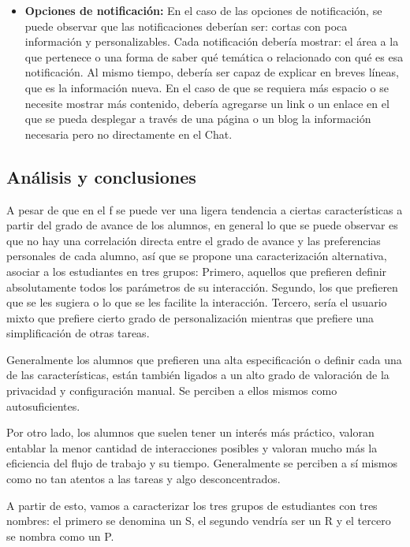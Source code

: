 \begin{itemize}
        \item \textbf{Opciones de notificación:} En el caso de las opciones de notificación, se puede observar que las notificaciones deberían ser: cortas con poca información y personalizables. Cada notificación debería mostrar: el área a la que pertenece o una forma de saber qué temática o relacionado con qué es esa notificación. Al mismo tiempo, debería ser capaz de explicar en breves líneas, que es la información nueva. En el caso de que se requiera más espacio o se necesite mostrar más contenido, debería agregarse un link o un enlace en el que se pueda desplegar a través de una página o un blog la información necesaria pero no directamente en el Chat.
        
    \end{itemize}

\subsection{Análisis y conclusiones}
    \par A pesar de que en el \acrlong{f} se puede ver una ligera tendencia a ciertas características a partir del grado de avance de los alumnos, en general lo que se puede observar es que no hay una correlación directa entre el grado de avance y las preferencias personales de cada alumno, así que se propone una caracterización alternativa, asociar a los estudiantes en tres grupos: Primero, aquellos que prefieren definir absolutamente todos los parámetros de su interacción. Segundo, los que prefieren que se les sugiera o lo que se les facilite la interacción. Tercero, sería el usuario mixto que prefiere cierto grado de personalización mientras que prefiere una simplificación de otras tareas.
    \par Generalmente los alumnos que prefieren una alta especificación o definir cada una de las características, están también ligados a un alto grado de valoración de la privacidad y configuración manual. Se perciben a ellos mismos como autosuficientes.
    \par Por otro lado, los alumnos que suelen tener un interés más práctico, valoran entablar la menor cantidad de interacciones posibles y valoran mucho más la eficiencia del flujo de trabajo y su tiempo. Generalmente se perciben a sí mismos como no tan atentos a las tareas y algo desconcentrados.
    \par A partir de esto, vamos a caracterizar los tres grupos de estudiantes con tres nombres: el primero se denomina un \acrfull{S}, el segundo vendría ser un \acrfull{R} y el tercero se nombra como un \acrfull{P}.
